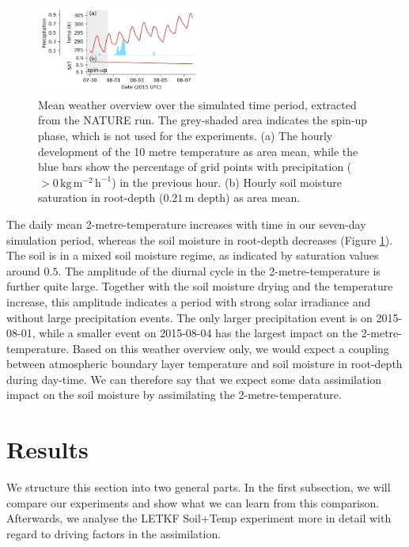 \documentclass[hess, manuscript]{copernicus}
\begin{document}
\begin{figure}
	\includegraphics[width=0.48\textwidth]{figures/fig_03_overview.png}
	\caption{
		Mean weather overview over the simulated time period, extracted from the NATURE run.
		The grey-shaded area indicates the spin-up phase, which is not used for the experiments.
		(a) The hourly development of the 10 metre temperature as area mean, while the blue bars show the percentage of grid points with precipitation ($> 0\,\text{kg}\,\text{m}^{-2}\,\text{h}^{-1}$) in the previous hour.
		(b) Hourly soil moisture saturation in root-depth ($0.21\,\text{m}$ depth) as area mean.
	}
	\label{fig:test_case_overview}
\end{figure}

The daily mean 2-metre-temperature increases with time in our seven-day simulation period, whereas the soil moisture in root-depth decreases (Figure \ref{fig:test_case_overview}).
The soil is in a mixed soil moisture regime, as indicated by saturation values around $0.5$.
The amplitude of the diurnal cycle in the 2-metre-temperature is further quite large.
Together with the soil moisture drying and the temperature increase, this amplitude indicates a period with strong solar irradiance and without large precipitation events.
The only larger precipitation event is on 2015-08-01, while a smaller event on 2015-08-04 has the largest impact on the 2-metre-temperature.
Based on this weather overview only, we would expect a coupling between atmospheric boundary layer temperature and soil moisture in root-depth during day-time.
We can therefore say that we expect some data assimilation impact on the soil moisture by assimilating the 2-metre-temperature.


\section{Results}\label{sec:results}

We structure this section into two general parts.
In the first subsection, we will compare our experiments and show what we can learn from this comparison.
Afterwards, we analyse the LETKF Soil+Temp experiment more in detail with regard to driving factors in the assimilation.\\
\end{document}
